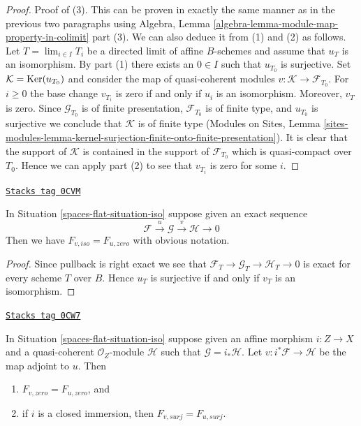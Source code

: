 \begin{proof}
\medskip\noindent
Proof of (3). This can be proven in exactly the same manner as in the
previous two paragraphs using
Algebra, Lemma \ref{algebra-lemma-module-map-property-in-colimit} part (3).
We can also deduce it from (1) and (2) as follows.
Let $T = \lim_{i \in I} T_i$ be a directed limit of affine $B$-schemes
and assume that $u_T$ is an isomorphism. By part (1) there exists
an $0 \in I$ such that $u_{T_0}$ is surjective. Set
$\mathcal{K} = \operatorname{Ker}(u_{T_0})$ and consider the map of quasi-coherent
modules $v : \mathcal{K} \to \mathcal{F}_{T_0}$. For $i \geq 0$ the base
change $v_{T_i}$ is zero if and only if $u_i$ is an isomorphism. Moreover,
$v_T$ is zero. Since $\mathcal{G}_{T_0}$
is of finite presentation, $\mathcal{F}_{T_0}$ is of finite type, and
$u_{T_0}$ is surjective we conclude that $\mathcal{K}$ is of finite type
(Modules on Sites, Lemma
\ref{sites-modules-lemma-kernel-surjection-finite-onto-finite-presentation}).
It is clear that the support of $\mathcal{K}$ is contained in the
support of $\mathcal{F}_{T_0}$ which is quasi-compact over $T_0$.
Hence we can apply part (2) to see that $v_{T_i}$ is zero for some $i$.
\end{proof}

\begin{lemma}
\label{spaces-flat-lemma-relate-zero-iso}
\href{https://stacks.math.columbia.edu/tag/0CVM}{\texttt{Stacks tag 0CVM}}

In Situation \ref{spaces-flat-situation-iso} suppose given an exact sequence
$$
\mathcal{F} \xrightarrow{u} \mathcal{G} \xrightarrow{v} \mathcal{H} \to 0
$$
Then we have $F_{v, iso} = F_{u, zero}$ with obvious notation.
\end{lemma}

\begin{proof}
Since pullback is right exact we see that
$\mathcal{F}_T \to \mathcal{G}_T \to \mathcal{H}_T \to 0$
is exact for every scheme $T$ over $B$. Hence $u_T$ is
surjective if and only if $v_T$ is an isomorphism.
\end{proof}

\begin{lemma}
\label{spaces-flat-lemma-relate-zero-affine}
\href{https://stacks.math.columbia.edu/tag/0CW7}{\texttt{Stacks tag 0CW7}}

In Situation \ref{spaces-flat-situation-iso} suppose given an affine morphism
$i : Z \to X$ and a quasi-coherent $\mathcal{O}_Z$-module $\mathcal{H}$
such that $\mathcal{G} = i_*\mathcal{H}$. Let
$v : i^*\mathcal{F} \to \mathcal{H}$ be the map adjoint to $u$.
Then
\begin{enumerate}
\item $F_{v, zero} = F_{u, zero}$, and
\item if $i$ is a closed immersion, then $F_{v, surj} = F_{u, surj}$.
\end{enumerate}
\end{lemma}

